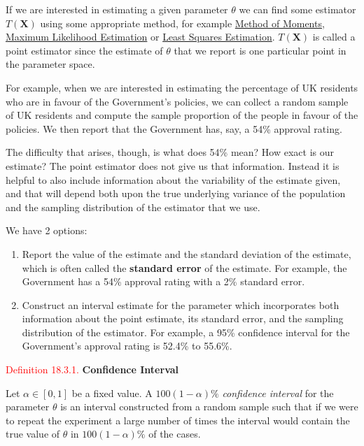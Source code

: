 \documentclass[
]{book}
\providecommand{\tightlist}{%
  \setlength{\itemsep}{0pt}\setlength{\parskip}{0pt}}
\begin{document}
If we are interested in estimating a given parameter \(\theta\) we can find some estimator \(T(\mathbf{X})\) using some appropriate method, for example \protect\hyperlink{MLE:moments}{Method of Moments}, \protect\hyperlink{MLE:MLE}{Maximum Likelihood Estimation} or \protect\hyperlink{Sec_LinearI:line}{Least Squares Estimation}. \(T(\mathbf{X})\) is called a point estimator since the estimate of \(\theta\) that we report is one particular point in the parameter space.

For example, when we are interested in estimating the percentage of UK residents who are in favour of the Government's policies, we can collect a random sample of UK residents and compute the sample proportion of the people in favour of the policies. We then report that the Government has, say, a 54\% approval rating.

The difficulty that arises, though, is what does 54\% mean? How exact is our estimate? The point estimator does not give us that information. Instead it is helpful to also include information about the variability of the estimate given, and that will depend both upon the true underlying variance of the population and the sampling distribution of the estimator that we use.

We have 2 options:

\begin{enumerate}
\def\labelenumi{\arabic{enumi}.}
\tightlist
\item
  Report the value of the estimate and the standard deviation of the estimate, which is often called the \textbf{standard error} of the estimate. For example, the Government has a 54\% approval rating with a 2\% standard error.\\
\item
  Construct an interval estimate for the parameter which incorporates both information about the point estimate, its standard error, and the sampling distribution of the estimator. For example, a 95\% confidence interval for the Government's approval rating is 52.4\% to 55.6\%.
\end{enumerate}

\leavevmode{}%
\textcolor{red}{Definition 18.3.1.}
{\textbf{Confidence Interval}}

Let \(\alpha \in [0,1]\) be a fixed value. A \(100(1-\alpha)\%\) \emph{confidence interval} for the parameter \(\theta\) is an interval constructed from a random sample such that if we were to repeat the experiment a large number of times the interval would contain the true value of \(\theta\) in \(100(1-\alpha)\%\) of the cases.
\end{document}
